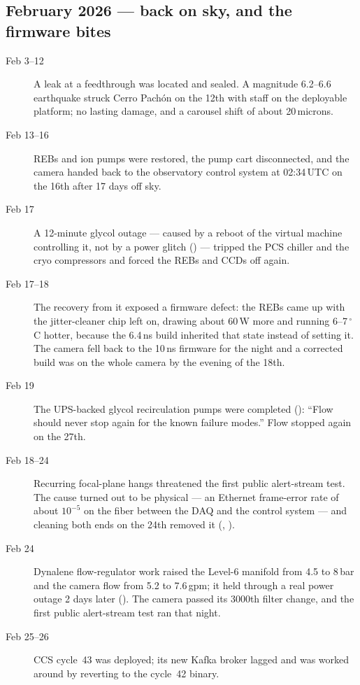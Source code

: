 \subsection{February 2026 --- back on sky, and the firmware bites}
\begin{description}

\item[Feb 3--12] A leak at a feedthrough was located and sealed.  A magnitude
  6.2--6.6 earthquake struck Cerro Pach\'on on the 12th with staff on
  the deployable platform; no lasting damage, and a carousel shift of
  about 20\,microns.

\item[Feb 13--16] REBs and ion pumps were restored, the pump cart
  disconnected, and the camera handed back to the observatory control
  system at 02:34\,UTC on the 16th after 17 days off sky.

\item[Feb 17] A 12-minute glycol outage --- caused by a reboot of the
  virtual machine controlling it, not by a power glitch
  () --- tripped the PCS chiller and the cryo
  compressors and forced the REBs and CCDs off again.

\item[Feb 17--18] The recovery from it exposed a firmware defect: the
  REBs came up with the jitter-cleaner chip left on, drawing about
  60\,W more and running 6--7\,$^{\circ}$C hotter, because the 6.4\,ns
  build inherited that state instead of setting it.  The camera fell
  back to the 10\,ns firmware for the night and a corrected build was
  on the whole camera by the evening of the 18th.

\item[Feb 19] The UPS-backed glycol recirculation pumps were completed
  (): ``Flow should never stop again for the
  known failure modes.''  Flow stopped again on the 27th.

\item[Feb 18--24] Recurring focal-plane hangs threatened the first
  public alert-stream test.  The cause turned out to be physical --- an
  Ethernet frame-error rate of about $10^{-5}$ on the fiber between the
  DAQ and the control system --- and cleaning both ends on the 24th
  removed it (, ).

\item[Feb 24] Dynalene flow-regulator work raised the Level-6 manifold
  from 4.5 to 8\,bar and the camera flow from 5.2 to 7.6\,gpm; it held
  through a real power outage 2 days later
  ().  The camera passed its 3000th filter
  change, and the first public alert-stream test ran that night.

\item[Feb 25--26] CCS cycle~43 was deployed; its new Kafka broker
  lagged and was worked around by reverting to the cycle~42 binary.

\end{description}

